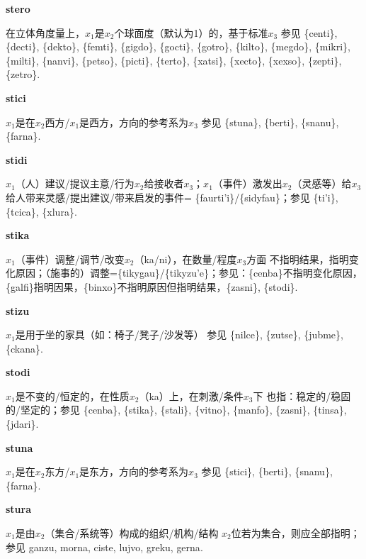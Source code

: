 \documentclass[notitlepage,twocolumn,a4paper,10pt]{book}
\begin{document}
{\sffamily\bfseries stero}\enspace {\ttfamily\bfseries[        te'o]}  在立体角度量上，$x_1$是$x_2$个球面度（默认为1）的，基于标准$x_3$ \textemdash{} 参见 \{centi\}, \{decti\}, \{dekto\}, \{femti\}, \{gigdo\}, \{gocti\}, \{gotro\}, \{kilto\}, \{megdo\}, \{mikri\}, \{milti\}, \{nanvi\}, \{petso\}, \{picti\}, \{terto\}, \{xatsi\}, \{xecto\}, \{xexso\}, \{zepti\}, \{zetro\}.

{\sffamily\bfseries stici}\enspace {\ttfamily\bfseries[sic]}  $x_1$是在$x_2$西方\slash{}$x_1$是西方，方向的参考系为$x_3$ \textemdash{} 参见 \{stuna\}, \{berti\}, \{snanu\}, \{farna\}.

{\sffamily\bfseries stidi}\enspace {\ttfamily\bfseries[sid     ti'i]}  $x_1$（人）建议\slash{}提议主意\slash{}行为$x_2$给接收者$x_3$；$x_1$（事件）激发出$x_2$（灵感等）给$x_3$ \textemdash{} 给人带来灵感\slash{}提出建议\slash{}带来启发的事件= \{faurti'i\}\slash{}\{sidyfau\}；参见 \{ti'i\}, \{tcica\}, \{xlura\}.

{\sffamily\bfseries stika}\enspace {\ttfamily\bfseries[tik]}  $x_1$（事件）调整\slash{}调节\slash{}改变$x_2$（ka\slash{}ni），在数量\slash{}程度$x_3$方面 \textemdash{} 不指明结果，指明变化原因；（施事的）调整=\{tikygau\}\slash{}\{tikyzu'e\}；参见：\{cenba\}不指明变化原因， \{galfi\}指明因果，\{binxo\}不指明原因但指明结果，\{zasni\}, \{stodi\}.

{\sffamily\bfseries stizu}\enspace {\ttfamily\bfseries[tiz]}  $x_1$是用于坐的家具（如：椅子\slash{}凳子\slash{}沙发等） \textemdash{} 参见 \{nilce\}, \{zutse\}, \{jubme\}, \{ckana\}.

{\sffamily\bfseries stodi}\enspace {\ttfamily\bfseries[    sto]}  $x_1$是不变的\slash{}恒定的，在性质$x_2$（ka）上，在刺激\slash{}条件$x_3$下 \textemdash{} 也指：稳定的\slash{}稳固的\slash{}坚定的；参见 \{cenba\}, \{stika\}, \{stali\}, \{vitno\}, \{manfo\}, \{zasni\}, \{tinsa\}, \{jdari\}.

{\sffamily\bfseries stuna}\enspace {\ttfamily\bfseries[sun]}  $x_1$是在$x_2$东方\slash{}$x_1$是东方，方向的参考系为$x_3$ \textemdash{} 参见 \{stici\}, \{berti\}, \{snanu\}, \{farna\}.

{\sffamily\bfseries stura}\enspace {\ttfamily\bfseries[tur     su'a]}  $x_1$是由$x_2$（集合\slash{}系统等）构成的组织\slash{}机构\slash{}结构 \textemdash{} $x_2$位若为集合，则应全部指明；参见 {ganzu}, {morna}, {ciste}, {lujvo}, {greku}, {gerna}.
\end{document}

